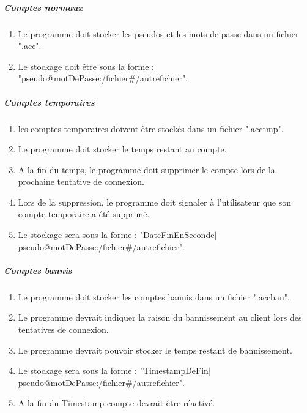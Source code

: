 \documentclass[10pt,a4paper]{report}
\begin{document}
	\subparagraph{Comptes normaux}
		\begin{enumerate}
			\item Le programme doit stocker les pseudos et les mots de passe dans un fichier ".acc".
			\item Le stockage doit être sous la forme : "pseudo@motDePasse:/fichier\#/autrefichier".
		\end{enumerate}
	\subparagraph{Comptes temporaires}
		\begin{enumerate}
			\item les comptes temporaires doivent être stockés dans un fichier ".acctmp".
			\item Le programme doit stocker le temps restant au compte.
			\item A la fin du temps, le programme doit supprimer le compte lors de la prochaine tentative de connexion.
			\item Lors de la suppression, le programme doit signaler à l'utilisateur que son compte temporaire a été supprimé.
			\item Le stockage sera sous la forme : "DateFinEnSeconde$ \vert $pseudo@motDePasse:/fichier\#/autrefichier".
		\end{enumerate}
		
	\subparagraph{Comptes bannis}
		\begin{enumerate}
			\item Le programme doit stocker les comptes bannis dans un fichier ".accban".
			\item Le programme devrait indiquer la raison du bannissement au client lors des tentatives de connexion.
			\item Le programme devrait pouvoir stocker le temps restant de bannissement.
			\item Le stockage sera sous la forme : "TimestampDeFin$ \vert $pseudo@motDePasse:/fichier\#/autrefichier".
			\item A la fin du Timestamp compte devrait être réactivé.
		\end{enumerate}
		
\end{document}
